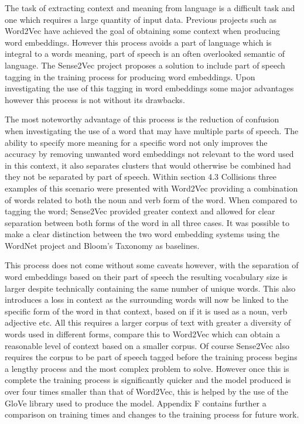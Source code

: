 The task of extracting context and meaning from language is a difficult task and one which requires a large quantity of input data. Previous projects such as Word2Vec have achieved the goal of obtaining some context when producing word embeddings. However this process avoids a part of language which is integral to a words meaning, part of speech is an often overlooked semantic of language. The Sense2Vec project proposes a solution to include part of speech tagging in the training process for producing word embeddings. Upon investigating the use of this tagging in word embeddings some major advantages however this process is not without its drawbacks.

The most noteworthy advantage of this process is the reduction of confusion when investigating the use of a word that may have multiple parts of speech. The ability to specify more meaning for a specific word not only improves the accuracy by removing unwanted word embeddings not relevant to the word used in this context, it also separates clusters that would otherwise be combined had they not be separated by part of speech. Within section 4.3 Collisions three examples of this scenario were presented with Word2Vec providing a combination of words related to both the noun and verb form of the word. When compared to tagging the word; Sense2Vec provided greater context and allowed for clear separation between both forms of the word in all three cases. It was possible to make a clear distinction between the two word embedding systems using the WordNet project and Bloom's Taxonomy as baselines.

This process does not come without some caveats however, with the separation of word embeddings based on their part of speech the resulting vocabulary size is larger despite technically containing the same number of unique words. This also introduces a loss in context as the surrounding words will now be linked to the specific form of the word in that context, based on if it is used as a noun, verb adjective etc. All this requires a larger corpus of text with greater a diversity of words used in different forms, compare this to Word2Vec which can obtain a reasonable level of context based on a smaller corpus. Of course Sense2Vec also requires the corpus to be part of speech tagged before the training process begins a lengthy process and the most complex problem to solve. However once this is complete the training process is significantly quicker and the model produced is over four times smaller than that of Word2Vec, this is helped by the use of the GloVe library used to produce the model. Appendix F contains further a comparison on training times and changes to the training process for future work.
